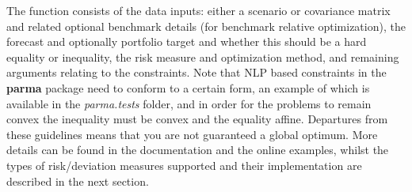 The function consists of the data inputs: either a scenario or covariance
matrix and related optional benchmark details (for benchmark relative optimization),
the forecast and optionally portfolio target and whether this should be a
hard equality or inequality, the risk measure and optimization method,
and remaining arguments relating to the constraints. Note that NLP based
constraints in the \textbf{parma} package need to conform to a certain form,
an example of which is available in the \emph{parma.tests} folder, and in order for
the problems to remain  convex the inequality must be convex and the equality affine.
Departures from  these guidelines means that you are not guaranteed a global optimum.
More details can be found in the documentation and the online examples, whilst the types of
risk/deviation measures supported and their implementation are described in the next section.
